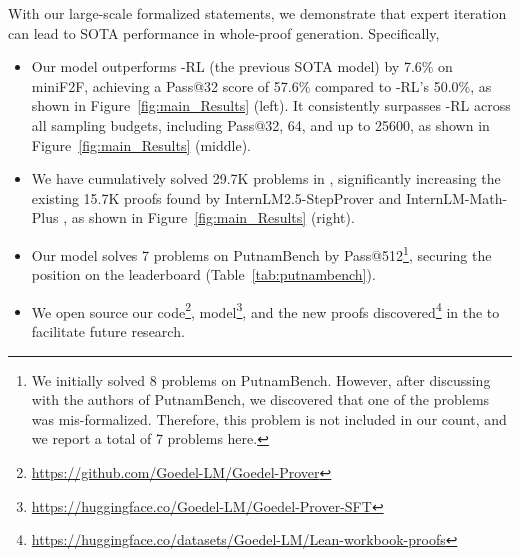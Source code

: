 With our large-scale formalized statements, we demonstrate that expert iteration can lead to SOTA performance in whole-proof generation. Specifically,
\begin{itemize}
    \item Our model outperforms \dsprover-RL (the previous SOTA model) by 7.6\% on miniF2F, achieving a Pass@32 score of 57.6\% compared to \dsprover-RL's 50.0\%, as shown in Figure~\ref{fig:main_Results} (left). It consistently surpasses \dsprover-RL across all sampling budgets, including Pass@32, 64, and up to 25600, as shown in Figure~\ref{fig:main_Results} (middle).



    \item We have cumulatively solved 29.7K problems in \lwb{}, significantly increasing the existing 15.7K proofs found by InternLM2.5-StepProver and InternLM-Math-Plus \citep{wu2024internlm2, ying2024internlm}, as shown in Figure~\ref{fig:main_Results} (right).
    
    \item Our model solves 7 problems on PutnamBench by Pass@512\footnote{We initially solved 8 problems on PutnamBench. However, after discussing with the authors of PutnamBench, we discovered that one of the problems was mis-formalized. Therefore, this problem is not included in our count, and we report a total of 7 problems here.}, securing the  position on the leaderboard (Table~\ref{tab:putnambench}).  
    \item We open source our code\footnote{\url{https://github.com/Goedel-LM/Goedel-Prover}}, model\footnote{\url{https://huggingface.co/Goedel-LM/Goedel-Prover-SFT}}, and the new proofs discovered\footnote{\url{https://huggingface.co/datasets/Goedel-LM/Lean-workbook-proofs}} in the \lwb{} to facilitate future research.
\end{itemize}

